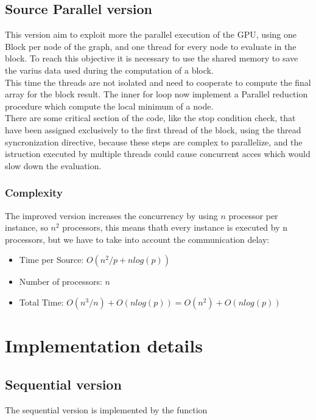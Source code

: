 \documentclass[
	a4paper, %
	12pt, %
]{class}
\begin{document}
\subsection{Source Parallel version}
This version aim to exploit more the parallel execution of the GPU, using one Block per node of the graph, and one thread for every node to evaluate in the block.
To reach this objective it is necessary to use the shared memory to save the varius data used during the computation of a block.\\

This time the threads are not isolated and need to cooperate to compute the final array for the block result.
The inner for loop now implement a Parallel reduction procedure which compute the local minimum of a node.\\

There are some critical section of the code, like the stop condition check, that have been assigned exclusively to the first thread of the block,
using the thread syncronization directive, because these steps are complex to parallelize, and the istruction executed by multiple threads could
cause concurrent acces which would slow down the evaluation.

\subsubsection{Complexity}
The improved version increases the concurrency by using $n$ processor per instance, so $n^2$ processors, this means thath every instance is executed
by n processors, but we have to take into account the communication delay:\\
\begin{itemize}
    \item Time per Source: $O(n^2/p + nlog(p))$
    \item Number of processors: $n$
    \item Total Time: $O(n^3 / n) + O(nlog(p)) = O(n^2) + O(nlog(p))$\\
\end{itemize}

\newpage
\section{Implementation details}

\subsection{Sequential version}
The sequential version is implemented by the function
\end{document}
